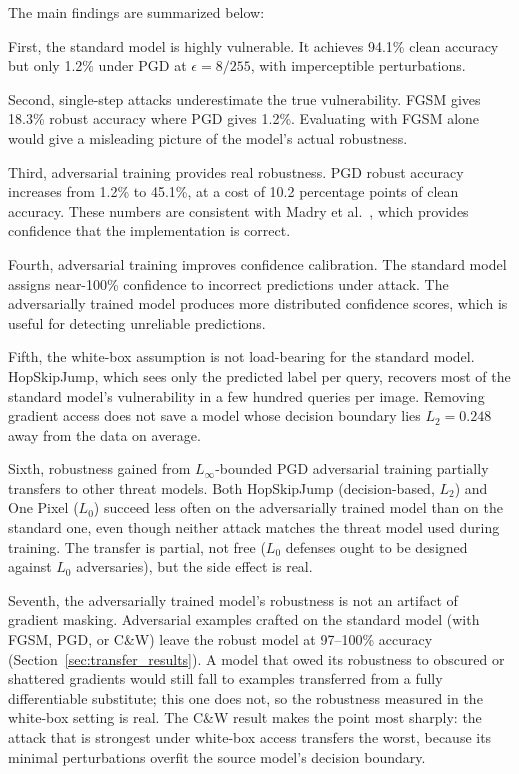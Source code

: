 The main findings are summarized below:

First, the standard model is highly vulnerable. It achieves 94.1\% clean accuracy but only 1.2\% under PGD at $\epsilon = 8/255$, with imperceptible perturbations.

Second, single-step attacks underestimate the true vulnerability. FGSM gives 18.3\% robust accuracy where PGD gives 1.2\%. Evaluating with FGSM alone would give a misleading picture of the model's actual robustness.

Third, adversarial training provides real robustness. PGD robust accuracy increases from 1.2\% to 45.1\%, at a cost of 10.2 percentage points of clean accuracy. These numbers are consistent with Madry et al.~\cite{madry2018towards}, which provides confidence that the implementation is correct.

Fourth, adversarial training improves confidence calibration. The standard model assigns near-100\% confidence to incorrect predictions under attack. The adversarially trained model produces more distributed confidence scores, which is useful for detecting unreliable predictions.

Fifth, the white-box assumption is not load-bearing for the standard model. HopSkipJump, which sees only the predicted label per query, recovers most of the standard model's vulnerability in a few hundred queries per image. Removing gradient access does not save a model whose decision boundary lies $L_2 = 0.248$ away from the data on average.

Sixth, robustness gained from $L_\infty$-bounded PGD adversarial training partially transfers to other threat models. Both HopSkipJump (decision-based, $L_2$) and One Pixel ($L_0$) succeed less often on the adversarially trained model than on the standard one, even though neither attack matches the threat model used during training. The transfer is partial, not free ($L_0$ defenses ought to be designed against $L_0$ adversaries), but the side effect is real.

Seventh, the adversarially trained model's robustness is not an artifact of gradient masking. Adversarial examples crafted on the standard model (with FGSM, PGD, or C\&W) leave the robust model at 97--100\% accuracy (Section~\ref{sec:transfer_results}). A model that owed its robustness to obscured or shattered gradients would still fall to examples transferred from a fully differentiable substitute; this one does not, so the robustness measured in the white-box setting is real. The C\&W result makes the point most sharply: the attack that is strongest under white-box access transfers the worst, because its minimal perturbations overfit the source model's decision boundary.

